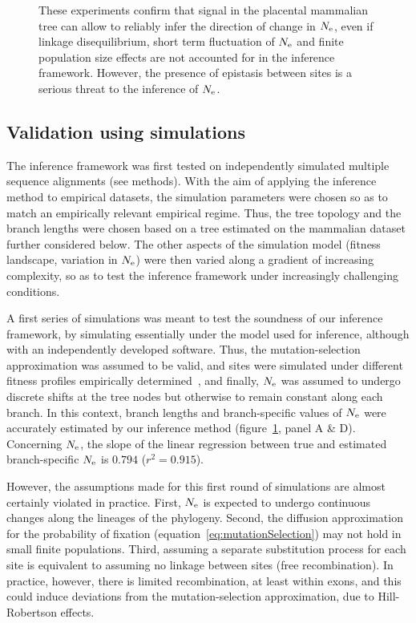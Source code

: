 \documentclass{article}
\begin{document}
\begin{figure}[t]
{            These experiments confirm that signal in the placental mammalian tree can allow to reliably infer the direction of change in $N_{\text{e}}$, even if linkage disequilibrium, short term fluctuation of $N_{\text{e}}$ and finite population size effects are not accounted for in the inference framework.
            However, the presence of epistasis between sites is a serious threat to the inference of $N_{\text{e}}$.
        }
        \label{fig:simulations}
    \end{figure}

    \subsection{Validation using simulations}
    \label{sec:ResultsSimulated}
    The inference framework was first tested on independently simulated multiple sequence alignments (see methods).
    With the aim of applying the inference method to empirical datasets, the simulation parameters were chosen so as to match an empirically relevant empirical regime.
    Thus, the tree topology and the branch lengths were chosen based on a tree estimated on the mammalian dataset further considered below.
    The other aspects of the simulation model (fitness landscape, variation in $N_{\text{e}}$) were then varied along a gradient of increasing complexity, so as to test the inference framework under increasingly challenging conditions.

    A first series of simulations was meant to test the soundness of our inference framework, by simulating essentially under the model used for inference, although with an independently developed software.
    Thus, the mutation-selection approximation was assumed to be valid, and sites were simulated under different fitness profiles empirically determined~\citep{Bloom2017}, and finally, $N_{\text{e}}$ was assumed to undergo discrete shifts at the tree nodes but otherwise to remain constant along each branch.
    In this context, branch lengths and branch-specific values of $N_{\text{e}}$ were accurately estimated by our inference method (figure~\ref{fig:simulations}, panel A \& D).
    Concerning $N_{\text{e}}$, the slope of the linear regression between true and estimated branch-specific $N_{\text{e}}$ is $0.794$ ($r^2=0.915$).

    However, the assumptions made for this first round of simulations are almost certainly violated in practice.
    First, $N_{\text{e}}$ is expected to undergo continuous changes along the lineages of the phylogeny.
    Second, the diffusion approximation for the probability of fixation (equation~\ref{eq:mutationSelection}) may not hold in small finite populations.
    Third, assuming a separate {substitution} process for each site is equivalent to assuming no linkage between sites (free recombination).
    In practice, however, there is limited {recombination}, at least within exons, and this could induce deviations from the mutation-selection approximation, due to Hill-Robertson effects.
\end{document}
